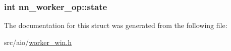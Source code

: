 \subsubsection[{state}]{\setlength{\rightskip}{0pt plus 5cm}int nn\+\_\+worker\+\_\+op\+::state}\hypertarget{structnn__worker__op_a25c39978f9c0ba61982f9f59ef17e89e}{}\label{structnn__worker__op_a25c39978f9c0ba61982f9f59ef17e89e}


The documentation for this struct was generated from the following file\+:\begin{DoxyCompactItemize}
\item 
src/aio/\hyperlink{worker__win_8h}{worker\+\_\+win.\+h}\end{DoxyCompactItemize}
